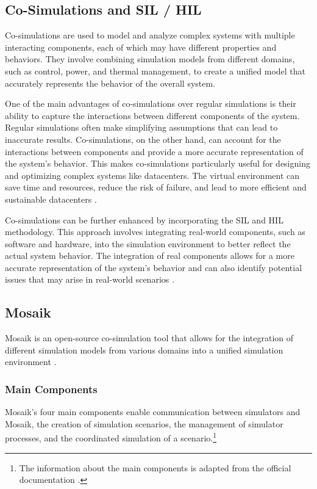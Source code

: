 \subsection{Co-Simulations and SIL / HIL}

Co-simulations are used to model and analyze complex systems with multiple
interacting components, each of which may have different properties and
behaviors. They involve combining simulation models from different domains, such
as control, power, and thermal management, to create a unified model that
accurately represents the behavior of the overall system.

One of the main advantages of co-simulations over regular simulations is their
ability to capture the interactions between different components of the system.
Regular simulations often make simplifying assumptions that can lead to
inaccurate results. Co-simulations, on the other hand, can account for the
interactions between components and provide a more accurate representation of
the system's behavior. This makes co-simulations particularly useful for
designing and optimizing complex systems like datacenters. The virtual
environment can save time and resources, reduce the risk of failure, and lead to
more efficient and sustainable datacenters \cite{vogt2018}.

Co-simulations can be further enhanced by incorporating the SIL and HIL
methodology. This approach involves integrating real-world components, such as
software and hardware, into the simulation environment to better reflect the
actual system behavior. The integration of real components allows for a more
accurate representation of the system's behavior and can also identify potential
issues that may arise in real-world scenarios \cite{kelemenova2013}.

\subsection{Mosaik}

Mosaik is an open-source co-simulation tool that allows for the integration of
different simulation models from various domains into a unified simulation
environment \cite{steinbrink2019}.

\subsubsection{Main Components}

Mosaik’s four main components enable communication between simulators and
Mosaik, the creation of simulation scenarios, the management of simulator
processes, and the coordinated simulation of a scenario.\footnote{The
information about the main components is adapted from the official
documentation \cite{mosaik_docs}.}

